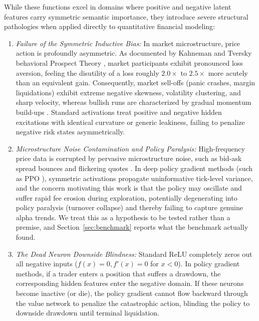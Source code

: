 \documentclass[conference]{IEEEtran}
\begin{document}
While these functions excel in domains where positive and negative latent features carry symmetric semantic importance, they introduce severe structural pathologies when applied directly to quantitative financial modeling:
\begin{enumerate}
    \item \textit{Failure of the Symmetric Inductive Bias:} In market microstructure, price action is profoundly asymmetric. As documented by Kahneman and Tversky behavioral Prospect Theory \cite{kahneman1979prospect}, market participants exhibit pronounced loss aversion, feeling the disutility of a loss roughly $2.0\times$ to $2.5\times$ more acutely than an equivalent gain. Consequently, market sell-offs (panic crashes, margin liquidations) exhibit extreme negative skewness, volatility clustering, and sharp velocity, whereas bullish runs are characterized by gradual momentum build-ups \cite{campbell1997econometrics}. Standard activations treat positive and negative hidden excitations with identical curvature or generic leakiness, failing to penalize negative risk states asymmetrically.
    \item \textit{Microstructure Noise Contamination and Policy Paralysis:} High-frequency price data is corrupted by pervasive microstructure noise, such as bid-ask spread bounces and flickering quotes \cite{roll1984simple}. In deep policy gradient methods (such as PPO \cite{schulman2017proximal}), symmetric activations propagate uninformative tick-level variance, and the concern motivating this work is that the policy may oscillate and suffer rapid fee erosion during exploration, potentially degenerating into policy paralysis (turnover collapse) and thereby failing to capture genuine alpha trends. We treat this as a hypothesis to be tested rather than a premise, and Section~\ref{sec:benchmark} reports what the benchmark actually found.
    \item \textit{The Dead Neuron Downside Blindness:} Standard ReLU completely zeros out all negative inputs ($f(x) = 0, f'(x) = 0$ for $x < 0$). In policy gradient methods, if a trader enters a position that suffers a drawdown, the corresponding hidden features enter the negative domain. If these neurons become inactive (or die), the policy gradient cannot flow backward through the value network to penalize the catastrophic action, blinding the policy to downside drawdown until terminal liquidation.
\end{enumerate}
\end{document}
